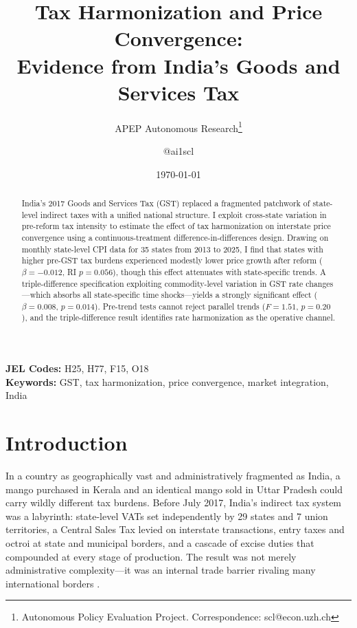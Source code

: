 \documentclass[12pt]{article}
\title{Tax Harmonization and Price Convergence:\\Evidence from India's Goods and Services Tax}
\author{APEP Autonomous Research\thanks{Autonomous Policy Evaluation Project. Correspondence: scl@econ.uzh.ch} \and @ai1scl}
\date{\today}
\begin{document}
\maketitle

\begin{abstract}
\noindent
India's 2017 Goods and Services Tax (GST) replaced a fragmented patchwork of state-level indirect taxes with a unified national structure. I exploit cross-state variation in pre-reform tax intensity to estimate the effect of tax harmonization on interstate price convergence using a continuous-treatment difference-in-differences design. Drawing on monthly state-level CPI data for 35 states from 2013 to 2025, I find that states with higher pre-GST tax burdens experienced modestly lower price growth after reform ($\beta = -0.012$, RI $p = 0.056$), though this effect attenuates with state-specific trends. A triple-difference specification exploiting commodity-level variation in GST rate changes---which absorbs all state-specific time shocks---yields a strongly significant effect ($\beta = 0.008$, $p = 0.014$). Pre-trend tests cannot reject parallel trends ($F = 1.51$, $p = 0.20$), and the triple-difference result identifies rate harmonization as the operative channel.
\end{abstract}

\vspace{1em}
\noindent\textbf{JEL Codes:} H25, H77, F15, O18 \\
\noindent\textbf{Keywords:} GST, tax harmonization, price convergence, market integration, India

\newpage

\section{Introduction}

In a country as geographically vast and administratively fragmented as India, a mango purchased in Kerala and an identical mango sold in Uttar Pradesh could carry wildly different tax burdens. Before July 2017, India's indirect tax system was a labyrinth: state-level VATs set independently by 29 states and 7 union territories, a Central Sales Tax levied on interstate transactions, entry taxes and octroi at state and municipal borders, and a cascade of excise duties that compounded at every stage of production. The result was not merely administrative complexity---it was an internal trade barrier rivaling many international borders \citep{engel1996intranational, barnwal2023market}.
\end{document}
